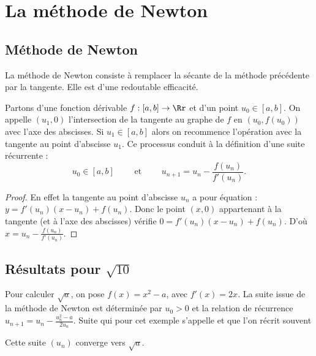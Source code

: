 \documentclass[class=report,crop=false]{standalone}
\begin{document}
\section{La méthode de Newton}

\subsection{Méthode de Newton}

La méthode de Newton consiste à remplacer la sécante de la méthode précédente par la tangente.
Elle est d'une redoutable efficacité.


Partons d'une fonction dérivable $f:[a,b] \to \Rr$ et d'un point $u_0 \in[a,b]$.
On appelle $(u_1,0)$ l'intersection de
la tangente au graphe de $f$ en $(u_0,f(u_0))$ avec l'axe des abscisses.
Si $u_1 \in[a,b]$ alors on recommence l'opération avec la tangente au point d'abscisse $u_1$.
Ce processus conduit à la définition d'une suite récurrente :
$$u_0 \in [a,b] \qquad \text{ et } \qquad u_{n+1} = u_n - \frac{f(u_n)}{f'(u_n)}.$$

\begin{proof}
En effet la tangente au point d'abscisse $u_n$ a pour équation :
$y = f'(u_n)(x-u_n)+f(u_n)$. Donc le point $(x,0)$ appartenant à la tangente (et à l'axe des abscisses)
vérifie $0=f'(u_n)(x-u_n)+f(u_n)$. D'où $x=u_n - \frac{f(u_n)}{f'(u_n)}.$
\end{proof}



\subsection{Résultats pour $\sqrt{10}$}

Pour calculer $\sqrt{a}$, on pose $f(x)=x^2-a$, avec $f'(x)=2x$. La suite issue de la méthode de Newton est déterminée par $u_0>0$ et la relation de récurrence $u_{n+1} = u_n - \frac{u_n^2-a}{2u_n}$.
Suite qui pour cet exemple s'appelle  et que l'on récrit souvent

\begin{proposition}
\label{prop:heron}
Cette suite $(u_n)$ converge vers $\sqrt{a}$.
\end{proposition}
\end{document}
